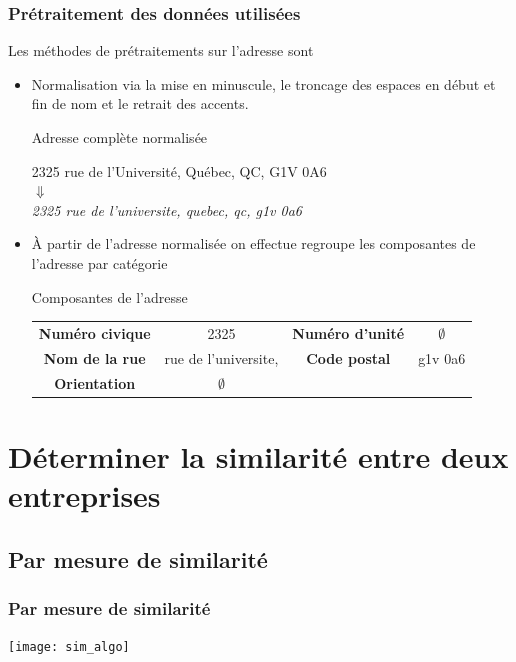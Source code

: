 \documentclass{beamer}
\begin{document}
	\begin{frame}[label=pretraitement-adresse]\frametitle{Prétraitement des données utilisées} 
		Les méthodes de prétraitements sur l'adresse sont
		\begin{itemize}
			\item<1-> Normalisation via la mise en minuscule, le troncage des espaces en début et fin de nom et le retrait des accents.
			\begin{block}{Adresse complète normalisée}
				\begin{center}
					2325 rue de l'Université, Québec, QC, G1V 0A6 \\ $\Downarrow$ \\ \textit{2325 rue de l'universite, quebec, qc, g1v 0a6}
				\end{center}
			\end{block}
			\item<2-> À partir de l'adresse normalisée on effectue regroupe les composantes de l'adresse par catégorie
			\begin{block}{Composantes de l'adresse}
				\begin{center}
					\scriptsize
					\begin{tabular}{cccc}
						\textbf{Numéro civique} & 2325                 & \textbf{Numéro d'unité} & $\emptyset$ \\
						\textbf{Nom de la rue}  & rue de l'universite, & \textbf{Code postal}    & g1v 0a6\\
						\textbf{Orientation}    & $\emptyset$                & &     \\
					\end{tabular}
				\end{center}
			\end{block}
		\end{itemize}
	\end{frame}
	
	\section{Déterminer la similarité entre deux entreprises}
	
	\subsection{Par mesure de similarité}
	
	\begin{frame}[label=sim]\frametitle{Par mesure de similarité}
		
		\begin{center}
			\texttt{[image: sim\_algo]}
		\end{center}
		
	\end{frame}
	
\end{document}
